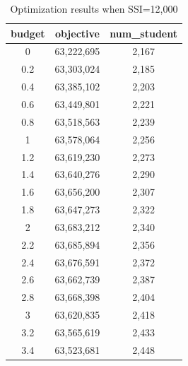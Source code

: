 \documentclass[12pt,english]{report}
\begin{document}
\begin{table}[h]
\centering
\caption{Optimization results when SSI=12,000}
\label{profit_rundown}
\begin{tabular}{|c|c|c|}
\hline
budget & objective  & num\_student \\ \hline
0      & 63,222,695 & 2,167        \\ \hline
0.2  & 63,303,024 & 2,185        \\ \hline
0.4  & 63,385,102 & 2,203        \\ \hline
0.6  & 63,449,801 & 2,221        \\ \hline
0.8  & 63,518,563 & 2,239        \\ \hline
1    & 63,578,064 & 2,256        \\ \hline
1.2  & 63,619,230 & 2,273        \\ \hline
1.4  & 63,640,276 & 2,290        \\ \hline
1.6  & 63,656,200 & 2,307        \\ \hline
1.8  & 63,647,273 & 2,322        \\ \hline
2    & 63,683,212 & 2,340        \\ \hline
2.2  & 63,685,894 & 2,356        \\ \hline
2.4  & 63,676,591 & 2,372        \\ \hline
2.6  & 63,662,739 & 2,387        \\ \hline
2.8  & 63,668,398 & 2,404        \\ \hline
3    & 63,620,835 & 2,418        \\ \hline
3.2  & 63,565,619 & 2,433        \\ \hline
3.4  & 63,523,681 & 2,448        \\ \hline
\end{tabular}
\end{table}
\end{document}

